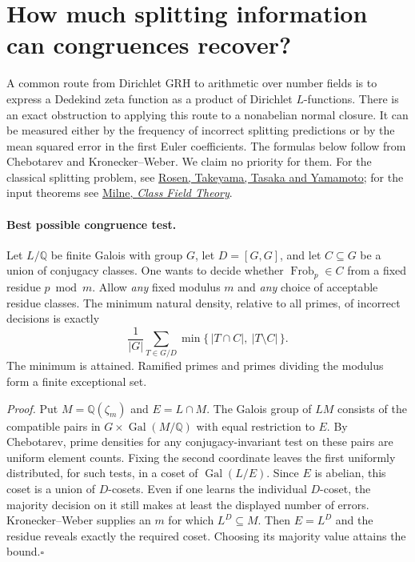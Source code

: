 \section{How much splitting information can congruences recover?}
\label{sec:rigidity}

A common route from Dirichlet GRH to arithmetic over number fields is to
express a Dedekind zeta function as a product of Dirichlet $L$-functions.
There is an exact obstruction to applying this route to a nonabelian normal
closure. It can be measured either by the frequency of incorrect splitting
predictions or by the mean squared error in the first Euler coefficients.
The formulas below follow from Chebotarev and Kronecker--Weber. We claim
no priority for them. For the classical splitting problem, see
\href{https://arxiv.org/abs/2208.11381}{Rosen, Takeyama, Tasaka and Yamamoto};
for the input theorems see
\href{https://www.jmilne.org/math/CourseNotes/cft.html}{Milne, \emph{Class Field Theory}}.

\paragraph{Best possible congruence test.}
Let $L/\mathbb Q$ be finite Galois with group $G$, let $D=[G,G]$, and let
$C\subseteq G$ be a union of conjugacy classes. One wants to decide whether
$\operatorname{Frob}_p\in C$ from a fixed residue $p\bmod m$. Allow
\emph{any} fixed modulus $m$ and \emph{any} choice of acceptable residue
classes. The minimum natural density, relative to all primes, of incorrect
decisions is exactly
\[
 \boxed{\displaystyle
  \frac{1}{|G|}\sum_{T\in G/D}\min\{\,|T\cap C|,\ |T\setminus C|\,\}.}
\]
The minimum is attained. Ramified primes and primes dividing the modulus
form a finite exceptional set.

\emph{Proof.} Put $M=\mathbb Q(\zeta_m)$ and $E=L\cap M$.
The Galois group of $LM$ consists of the compatible pairs in
$G\times\operatorname{Gal}(M/\mathbb Q)$ with equal restriction to $E$.
By Chebotarev, prime densities for any conjugacy-invariant test on these
pairs are uniform element counts. Fixing the second coordinate leaves the
first uniformly distributed, for such tests, in a coset of
$\operatorname{Gal}(L/E)$. Since $E$ is abelian, this coset is a union
of $D$-cosets. Even if one learns the individual $D$-coset, the majority
decision on it still makes at least the displayed number of errors.
Kronecker--Weber supplies an $m$ for which $L^D\subseteq M$. Then
$E=L^D$ and the residue reveals exactly the required coset. Choosing its
majority value attains the bound.\hfill$\square$


